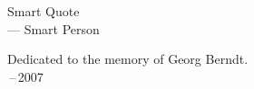 \thispagestyle{empty}
{}

\vspace*{3cm}

\begin{center}
  Smart Quote \\ \medskip
    --- Smart Person
\end{center}

\medskip

\begin{center}
    Dedicated to the memory of Georg Berndt. \\ \,--\,2007
\end{center}
